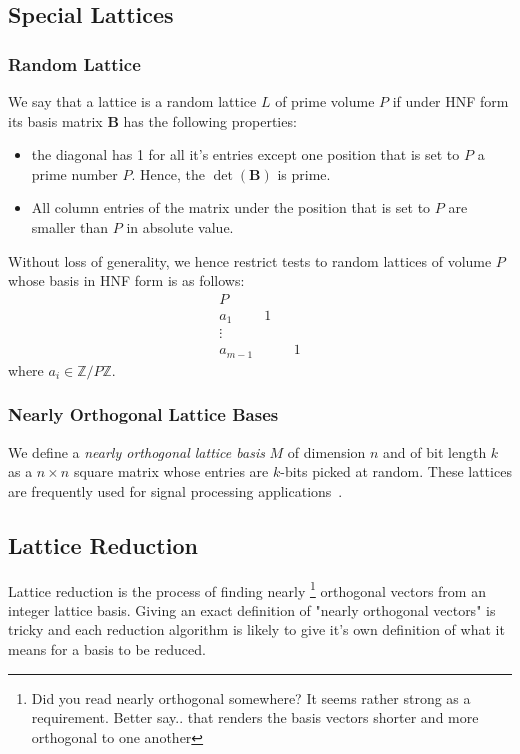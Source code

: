 \documentclass[10pt, a4paper]{article}
\newcommand{\my}[1]{{\color{blue} #1 }}
\renewcommand{\vec}[1]{\mathbf{#1}}
\begin{document}
\subsection{Special Lattices}

\subsubsection{Random Lattice}

We say that a lattice is a random lattice $L$ \my{ of prime volume $P$} if under HNF form its basis matrix $\vec{B}$ has the following properties:

\begin{itemize}
\item the diagonal has 1 for all it's entries except \my{one position that is set to $P$}a prime number $P$. Hence, the $\det(\vec{B})$ is prime.
\item All \my{column }entries of the matrix under \my{the position that is set to }$P$ are smaller than $P$ in absolute value.
\end{itemize}

\my{Without loss of generality, we hence restrict tests to random lattices of volume $P$ whose basis in HNF form is as follows:
$$\begin{array}{ccccc}
P & & &\\
a_1& 1&   & \\ 
\vdots & &  & \\ 
a_{m-1}& & &1 
\end{array}$$
where $a_i \in \mathbb{Z}/ P\mathbb{Z}$.
}

\subsubsection{Nearly Orthogonal Lattice Bases}

We define a \emph{nearly orthogonal lattice basis} $M$ of dimension $n$ and of bit length $k$ as a $n \times n$ square matrix whose entries are $k$-bits picked at random. These lattices are frequently used for signal processing applications~\cite{originalJacobiMethodLatticeBasisReduction}.

\subsection{Lattice Reduction}

Lattice reduction is the process of finding \my{nearly}\footnote{\my{Did you read nearly orthogonal somewhere? It seems rather strong as a requirement. Better say.. that renders the basis vectors shorter and more orthogonal to one another}} orthogonal vectors from an integer lattice basis. Giving an exact definition of "nearly orthogonal vectors" is tricky and each reduction algorithm is likely to give it's own definition of what it means for a basis to be reduced.
\end{document}
